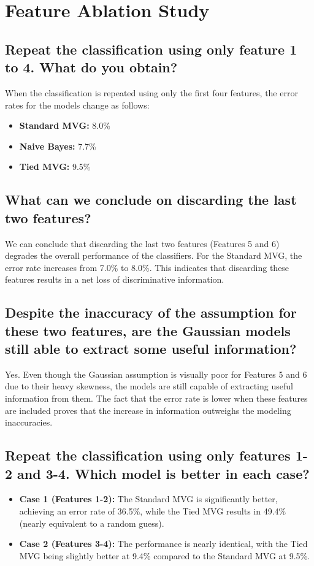 \section{Feature Ablation Study}

\subsection*{Repeat the classification using only feature 1 to 4. What do you obtain?}
When the classification is repeated using only the first four features, the error rates for the models change as follows:
\begin{itemize}
    \item \textbf{Standard MVG:} 8.0\%
    \item \textbf{Naive Bayes:} 7.7\%
    \item \textbf{Tied MVG:} 9.5\%
\end{itemize}

\subsection*{What can we conclude on discarding the last two features?}
We can conclude that discarding the last two features (Features 5 and 6) degrades the overall performance of the classifiers. For the Standard MVG, the error rate increases from 7.0\% to 8.0\%. This indicates that discarding these features results in a net loss of discriminative information.

\subsection*{Despite the inaccuracy of the assumption for these two features, are the Gaussian models still able to extract some useful information?}
Yes. Even though the Gaussian assumption is visually poor for Features 5 and 6 due to their heavy skewness, the models are still capable of extracting useful information from them. The fact that the error rate is lower when these features are included proves that the increase in information outweighs the modeling inaccuracies.

\subsection*{Repeat the classification using only features 1-2 and 3-4. Which model is better in each case?}
\begin{itemize}
    \item \textbf{Case 1 (Features 1-2):} The Standard MVG is significantly better, achieving an error rate of 36.5\%, while the Tied MVG results in 49.4\% (nearly equivalent to a random guess).
    \item \textbf{Case 2 (Features 3-4):} The performance is nearly identical, with the Tied MVG being slightly better at 9.4\% compared to the Standard MVG at 9.5\%.
\end{itemize}

